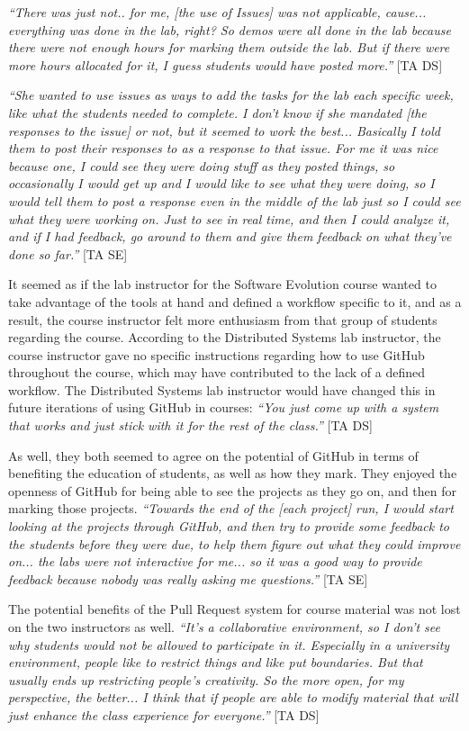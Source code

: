 \textit{``There was just not.. for me, [the use of Issues] was not applicable, cause... everything was done in the lab, right? So demos were all done in the lab because there were not enough hours for marking them outside the lab. But if there were more hours allocated for it, I guess students would have posted more.''} [TA DS]

\textit{``She wanted to use issues as ways to add the tasks for the lab each specific week, like what the students needed to complete. I don't know if she mandated [the responses to the issue] or not, but it seemed to work the best... Basically I told them to post their responses to as a response to that issue. For me it was nice because one, I could see they were doing stuff as they posted things, so occasionally I would get up and I would like to see what they were doing, so I would tell them to post a response even in the middle of the lab just so I could see what they were working on. Just to see in real time, and then I could analyze it, and if I had feedback, go around to them and give them feedback on what they've done so far.''} [TA SE]

It seemed as if the lab instructor for the Software Evolution course wanted to take advantage of the tools at hand and defined a workflow specific to it, and as a result, the course instructor felt more enthusiasm from that group of students regarding the course. According to the Distributed Systems lab instructor, the course instructor gave no specific instructions regarding how to use GitHub throughout the course, which may have contributed to the lack of a defined workflow. The Distributed Systems lab instructor would have changed this in future iterations of using GitHub in courses: \textit{``You just come up with a system that works and just stick with it for the rest of the class.''} [TA DS]

As well, they both seemed to agree on the potential of GitHub in terms of benefiting the education of students, as well as how they mark. They enjoyed the openness of GitHub for being able to see the projects as they go on, and then for marking those projects. \textit{``Towards the end of the [each project] run, I would start looking at the projects through GitHub, and then try to provide some feedback to the students before they were due, to help them figure out what they could improve on... the labs were not interactive for me... so it was a good way to provide feedback because nobody was really asking me questions.''} [TA SE]

The potential benefits of the Pull Request system for course material was not lost on the two instructors as well. \textit{``It's a collaborative environment, so I don't see why students would not be allowed to participate in it. Especially in a university environment, people like to restrict things and like put boundaries. But that usually ends up restricting people's creativity. So the more open, for my perspective, the better... I think that if people are able to modify material that will just enhance the class experience for everyone.''} [TA DS]

